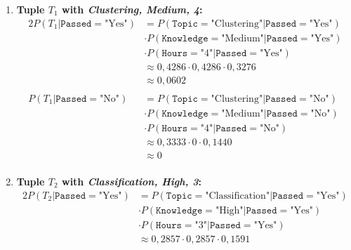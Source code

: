 \documentclass[
english,
smallborders
]{i6prcsht}
\newcommand{\Likelihood}[4]{P(\texttt{#1}=\text{"#2"} | \texttt{#3}=\text{"#4"})}
\newcommand{\LikelihoodTuple}[3]{P(#1 | \texttt{#2}=\text{"#3"})}
\begin{document}
\begin{solution}
\begin{enumerate}
		      \begin{enumerate}	
			      \item \textbf{Tuple $T_1$ with \textit{Clustering, Medium, 4}:}
			            \begin{alignat*}{2}
				            \LikelihoodTuple{T_1}{Passed}{Yes} & =  \Likelihood{Topic}{Clustering}{Passed}{Yes}    \\
				                                               & \cdot \Likelihood{Knowledge}{Medium}{Passed}{Yes} \\
				                                               & \cdot \Likelihood{Hours}{4}{Passed}{Yes}          \\
				                                               & \approx 0,4286 \cdot 0,4286 \cdot 0,3276          \\
				                                               & \approx 0,0602                                    \\
				                                               &                                                   \\
				            \LikelihoodTuple{T_1}{Passed}{No}  & =  \Likelihood{Topic}{Clustering}{Passed}{No}     \\
				                                               & \cdot \Likelihood{Knowledge}{Medium}{Passed}{No}  \\
				                                               & \cdot \Likelihood{Hours}{4}{Passed}{No}           \\
				                                               & \approx  0,3333 \cdot 0 \cdot 0,1440              \\
				                                               & \approx 0                                         \\
			            \end{alignat*}
			      \item \textbf{Tuple $T_2$ with \textit{Classification, High, 3}:}
			            \begin{alignat*}{2}
				            \LikelihoodTuple{T_2}{Passed}{Yes} & =  \Likelihood{Topic}{Classification}{Passed}{Yes} \\
				                                               & \cdot \Likelihood{Knowledge}{High}{Passed}{Yes}    \\
				                                               & \cdot \Likelihood{Hours}{3}{Passed}{Yes}           \\
				                                               & \approx  0,2857 \cdot 0,2857 \cdot 0,1591          \\

\end{alignat*}
\end{enumerate}
\end{enumerate}
\end{solution}
\end{document}
